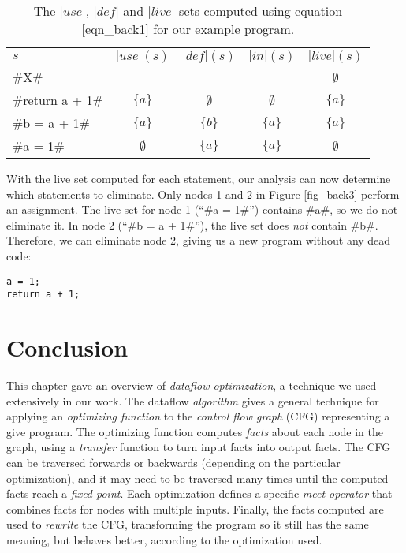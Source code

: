 \documentclass[12pt]{report}
\begin{document}
\begin{table}
  \centering
  \begin{tabular}{lcccc}
    $s$ & $|use|(s)$ & $|def|(s)$ & $|in|(s)$ &  $|live|(s)$ \\
    \cmidrule(r){1-1}\cmidrule(r){2-2}\cmidrule(r){3-3}\cmidrule(r){4-4}\cmidrule(r){5-5}
    #X# & & & & $\emptyset$ \\
    #return a + 1# & $\{a\}$ & $\emptyset$ & $\emptyset$ & $\{a\}$ \\
    #b = a + 1# & $\{a\}$ & $\{b\}$ & $\{a\}$ & $\{a\}$ \\
    #a = 1# & $\emptyset$ & $\{a\}$ & $\{a\}$ & $\emptyset$ \\
    \bottomrule
  \end{tabular}
  \caption{The $|use|$, $|def|$ and $|live|$ sets computed using equation \ref{eqn_back1} for our example program.}
  \label{tbl_back1}
\end{table}

With the live set computed for each statement, our analysis can now
determine which statements to eliminate. Only nodes 1 and 2 in Figure
\ref{fig_back3} perform an assignment. The live set for node 1 (``#a = 1#'')
contains #a#, so we do not eliminate it. In node 2 (``#b = a + 1#''),
the live set does \emph{not} contain #b#. Therefore, we can eliminate
node 2, giving us a new program without any dead code:

\begin{Verbatim}
a = 1;
return a + 1;
\end{Verbatim}

\section{Conclusion}

This chapter gave an overview of \emph{dataflow optimization}, a
technique we used extensively in our work. The dataflow
\emph{algorithm} gives a general technique for applying an
\emph{optimizing function} to the \emph{control flow graph} (CFG)
representing a give program. The optimizing function computes
\emph{facts} about each node in the graph, using a \emph{transfer}
function to turn input facts into output facts. The CFG can be
traversed forwards or backwards (depending on the particular
optimization), and it may need to be traversed many times until the
computed facts reach a \emph{fixed point}.  Each optimization defines
a specific \emph{meet operator} that combines facts for nodes with
multiple inputs. Finally, the facts computed are used to
\emph{rewrite} the CFG, transforming the program so it still has the
same meaning, but behaves better, according to the optimization used.
\end{document}
